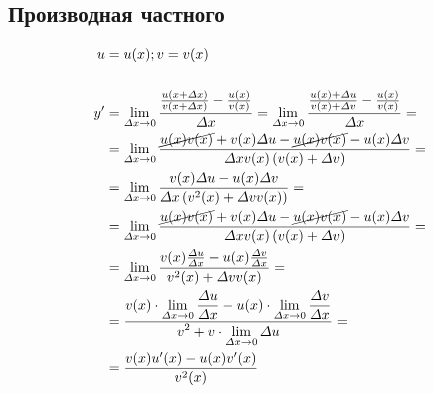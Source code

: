 \documentclass[12pt, fleqn]{article}
\begin{document}
\subsection{Производная частного}
\begin{align*}
	u&=u(x); v = v(x)\\\\
	y^\prime &= \lim_{\varDelta x \to 0} \frac
	{\frac
		{u(x+\varDelta x)}
		{v(x+\varDelta x)}
		 - 
		 \frac
		 {u(x)}
		 {v(x)}}
	{\varDelta x}=
	\lim_{\varDelta x \to 0} \frac
	{\frac
		{u(x)+\varDelta u}
		{v(x)+\varDelta v}
		- 
		\frac
		{u(x)}
		{v(x)}}
	{\varDelta x}=\\
	&= \lim_{\varDelta x \to 0} \frac
	{
		\cancel{u(x)v(x)}+v(x)\varDelta u-\cancel{u(x)v(x)}-u(x)\varDelta v
	}
	{\varDelta x v(x)\left(v(x)+\varDelta v\right)}=\\
	&= \lim_{\varDelta x \to 0} \frac
	{
		v(x)\varDelta u-u(x)\varDelta v
	}
	{\varDelta x \left(v^2(x)+\varDelta vv(x)\right)}=\\
	&= \lim_{\varDelta x \to 0} \frac
	{
		\cancel{u(x)v(x)}+v(x)\varDelta u-\cancel{u(x)v(x)}-u(x)\varDelta v
	}
	{\varDelta x v(x)\left(v(x)+\varDelta v\right)}=\\
	&= \lim_{\varDelta x \to 0} \frac{
		v(x)\frac
		{\varDelta u}{\varDelta x}-u(x)\frac{\varDelta v}{\varDelta x}
	}
	{v^2(x)+\varDelta vv(x)}=\\
	&=\frac{\begin{gathered}
		v(x)\cdot \lim_{\varDelta x \to 0}\frac{\varDelta u}{\varDelta x} - u(x)\cdot \lim_{\varDelta x \to 0}\frac{\varDelta v}{\varDelta x}\end{gathered}}{\begin{gathered}
		v^2+v\cdot\lim_{\varDelta x \to 0}\varDelta u \end{gathered}}=\\
	&=\frac{v(x)u^\prime(x)-u(x)v^\prime(x)}{v^2(x)}\\
\end{align*}
\end{document}
